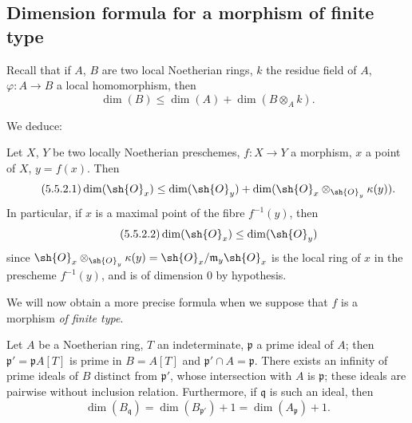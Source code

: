 \subsection{Dimension formula for a morphism of finite type}
\label{subsection:IV.5.5}

\begin{env}[5.5.1]
\label{IV.5.5.1}
Recall  that if $A$, $B$ are two local Noetherian rings, $k$ the residue field of $A$, $\varphi:A\to B$ a local homomorphism, then
\[
\tag{5.5.1.1}\label{IV.5.5.1.1}
  \dim(B) \leq \dim(A) + \dim(B\otimes_A k).
\]
\end{env}

We deduce:

\begin{proposition}[5.5.2]
\label{IV.5.5.2}
Let $X$, $Y$ be two locally Noetherian preschemes, $f:X\to Y$ a morphism, $x$ a point of $X$, $y=f(x)$.
Then
\[
\tag{5.5.2.1}\label{IV.5.5.2.1}
  \dim(\sh{O}_x) \leq \dim(\sh{O}_y) + \dim(\sh{O}_x\otimes_{\sh{O}_y}\kappa(y)).
\]
In particular, if $x$ is a maximal point of the fibre $f^{-1}(y)$, then
\[
\tag{5.5.2.2}\label{IV.5.5.2.2}
  \dim(\sh{O}_x) \leq \dim(\sh{O}_y)
\]
since $\sh{O}_x\otimes_{\sh{O}_y}\kappa(y)=\sh{O}_x/\mathfrak{m}_y\sh{O}_x$ is the local ring of $x$ in the prescheme $f^{-1}(y)$, and is of dimension $0$ by hypothesis.
\end{proposition}


We will now obtain a more precise formula when we suppose that $f$ is a morphism \emph{of finite type}.

\begin{proposition}[5.5.3]
\label{IV.5.5.3}
Let $A$ be a Noetherian ring, $T$ an indeterminate, $\mathfrak{p}$ a prime ideal of $A$; then $\mathfrak{p}'=\mathfrak{p}A[T]$ is prime in $B=A[T]$ and $\mathfrak{p}'\cap A=\mathfrak{p}$.
There exists an infinity of prime ideals of $B$ distinct from $\mathfrak{p}'$, whose intersection with $A$ is $\mathfrak{p}$; these ideals are pairwise without inclusion relation.
Furthermore, if $\mathfrak{q}$ is such an ideal, then
\[
\tag{5.5.3.1}\label{IV.5.5.3.1}
  \dim(B_\mathfrak{q}) = \dim(B_{\mathfrak{p}'}) + 1 = \dim(A_\mathfrak{p}) + 1.
\]
\end{proposition}

